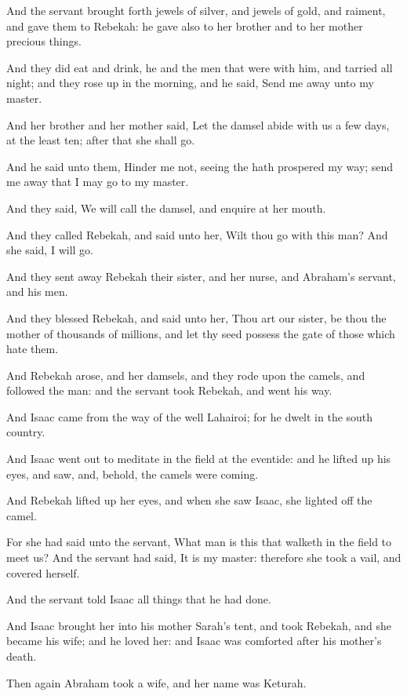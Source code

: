 \Verse And the servant brought forth jewels of silver, and jewels of gold, and raiment, and gave them to Rebekah: he gave also to her brother and to her mother precious things.

\Verse And they did eat and drink, he and the men that were with him, and tarried all night; and they rose up in the morning, and he said, Send me away unto my master.

\Verse And her brother and her mother said, Let the damsel abide with us a few days, at the least ten; after that she shall go.

\Verse And he said unto them, Hinder me not, seeing the \LORD hath prospered my way; send me away that I may go to my master.

\Verse And they said, We will call the damsel, and enquire at her mouth.

\Verse And they called Rebekah, and said unto her, Wilt thou go with this man? And she said, I will go.

\Verse And they sent away Rebekah their sister, and her nurse, and Abraham's servant, and his men.

\Verse And they blessed Rebekah, and said unto her, Thou art our sister, be thou the mother of thousands of millions, and let thy seed possess the gate of those which hate them.

\Verse And Rebekah arose, and her damsels, and they rode upon the camels, and followed the man: and the servant took Rebekah, and went his way.

\Verse And Isaac came from the way of the well Lahairoi; for he dwelt in the south country.

\Verse And Isaac went out to meditate in the field at the eventide: and he lifted up his eyes, and saw, and, behold, the camels were coming.

\Verse And Rebekah lifted up her eyes, and when she saw Isaac, she lighted off the camel.

\Verse For she had said unto the servant, What man is this that walketh in the field to meet us? And the servant had said, It is my master: therefore she took a vail, and covered herself.

\Verse And the servant told Isaac all things that he had done.

\Verse And Isaac brought her into his mother Sarah's tent, and took Rebekah, and she became his wife; and he loved her: and Isaac was comforted after his mother's death.

\Chapter
\Verse Then again Abraham took a wife, and her name was Keturah.

